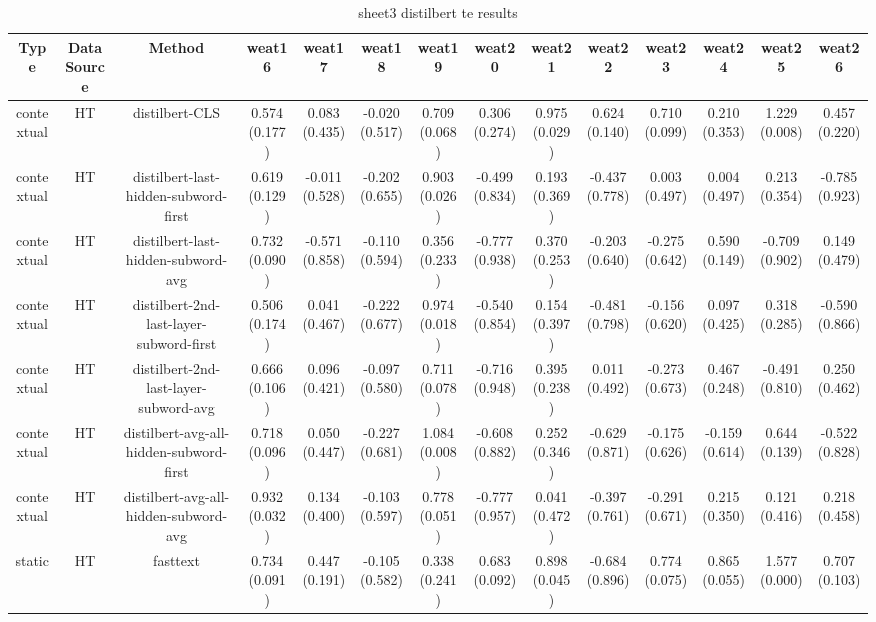 \begin{sidewaystable}[htb]
    \centering
    \caption{sheet3 distilbert te results}
    \label{appendix_tab:sheet3_distilbert_te_results}
    \small
    \begin{tabular}{@{}cccccccccccccc@{}}
        \toprule
        Type & DataSource & Method & weat16 & weat17 & weat18 & weat19 & weat20 & weat21 & weat22 & weat23 & weat24 & weat25 & weat26 \\
        \midrule
        contextual & HT & distilbert-CLS & 0.574 (0.177) & 0.083 (0.435) & -0.020 (0.517) & 0.709 (0.068) & 0.306 (0.274) & 0.975 (0.029) & 0.624 (0.140) & 0.710 (0.099) & 0.210 (0.353) & 1.229 (0.008) & 0.457 (0.220) \\
        contextual & HT & distilbert-last-hidden-subword-first & 0.619 (0.129) & -0.011 (0.528) & -0.202 (0.655) & 0.903 (0.026) & -0.499 (0.834) & 0.193 (0.369) & -0.437 (0.778) & 0.003 (0.497) & 0.004 (0.497) & 0.213 (0.354) & -0.785 (0.923) \\
        contextual & HT & distilbert-last-hidden-subword-avg & 0.732 (0.090) & -0.571 (0.858) & -0.110 (0.594) & 0.356 (0.233) & -0.777 (0.938) & 0.370 (0.253) & -0.203 (0.640) & -0.275 (0.642) & 0.590 (0.149) & -0.709 (0.902) & 0.149 (0.479) \\
        contextual & HT & distilbert-2nd-last-layer-subword-first & 0.506 (0.174) & 0.041 (0.467) & -0.222 (0.677) & 0.974 (0.018) & -0.540 (0.854) & 0.154 (0.397) & -0.481 (0.798) & -0.156 (0.620) & 0.097 (0.425) & 0.318 (0.285) & -0.590 (0.866) \\
        contextual & HT & distilbert-2nd-last-layer-subword-avg & 0.666 (0.106) & 0.096 (0.421) & -0.097 (0.580) & 0.711 (0.078) & -0.716 (0.948) & 0.395 (0.238) & 0.011 (0.492) & -0.273 (0.673) & 0.467 (0.248) & -0.491 (0.810) & 0.250 (0.462) \\
        contextual & HT & distilbert-avg-all-hidden-subword-first & 0.718 (0.096) & 0.050 (0.447) & -0.227 (0.681) & 1.084 (0.008) & -0.608 (0.882) & 0.252 (0.346) & -0.629 (0.871) & -0.175 (0.626) & -0.159 (0.614) & 0.644 (0.139) & -0.522 (0.828) \\
        contextual & HT & distilbert-avg-all-hidden-subword-avg & 0.932 (0.032) & 0.134 (0.400) & -0.103 (0.597) & 0.778 (0.051) & -0.777 (0.957) & 0.041 (0.472) & -0.397 (0.761) & -0.291 (0.671) & 0.215 (0.350) & 0.121 (0.416) & 0.218 (0.458) \\
        static & HT & fasttext & 0.734 (0.091) & 0.447 (0.191) & -0.105 (0.582) & 0.338 (0.241) & 0.683 (0.092) & 0.898 (0.045) & -0.684 (0.896) & 0.774 (0.075) & 0.865 (0.055) & 1.577 (0.000) & 0.707 (0.103) \\

\end{tabular}
\end{sidewaystable}
